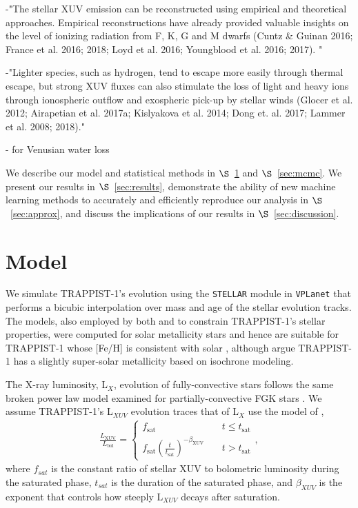 \documentclass[twocolumn]{aastex62}
\newcommand{\vplanet}[0]{\texttt{VPLanet}\xspace}
\newcommand{\stellar}[0]{\texttt{STELLAR}\xspace}
\begin{document}
-"The stellar XUV emission can be reconstructed using empirical and theoretical
approaches. Empirical reconstructions have already provided valuable insights on the level of
ionizing radiation from F, K, G and M dwarfs (Cuntz \& Guinan 2016; France et al. 2016; 2018;
Loyd et al. 2016; Youngblood et al. 2016; 2017). "

-"Lighter species, such as hydrogen, tend to escape more easily through thermal escape, but
strong XUV fluxes can also stimulate the loss of light and heavy ions through ionospheric
outflow and exospheric pick-up by stellar winds (Glocer et al. 2012; Airapetian et al. 2017a;
Kislyakova et al. 2014; Dong et. al. 2017; Lammer et al. 2008; 2018)."

-\citet{Chassefiere1997} for Venusian water loss

We describe our model and statistical methods in $\S$~\ref{sec:model} and $\S$~\ref{sec:mcmc}. We present our results in $\S$~\ref{sec:results}, demonstrate the ability of new machine learning methods to accurately and efficiently reproduce our analysis in $\S$~\ref{sec:approx}, and discuss the implications of our results in $\S$~\ref{sec:discussion}.

\section{Model} \label{sec:model}

We simulate TRAPPIST-1's evolution using the \stellar module in \vplanet \citep{Barnes2019} that performs a bicubic interpolation over mass and age of the \citet{Baraffe2015} stellar evolution tracks. The \citet{Baraffe2015} models, also employed by both \citet{Burgasser2017} and \citet{vanGrootel2018} to constrain TRAPPIST-1's stellar properties, were computed for solar metallicity stars and hence are suitable for TRAPPIST-1 whose [Fe/H] is consistent with solar \citep{Gillon2016}, although \citet{Burgasser2017} argue TRAPPIST-1 has a slightly super-solar metallicity based on isochrone modeling.

The X-ray luminosity, L$_{X}$, evolution of fully-convective stars follows the same broken power law model examined for partially-convective FGK stars \citep{Wright2016,Wright2018}. We assume TRAPPIST-1's L$_{XUV}$ evolution traces that of L$_{X}$ use the model of \citet{Ribas2005},
\begin{align}
\label{eqn:lxuv}
\frac{L_\mathrm{XUV}}{L_\mathrm{bol}} = \left\{
				\begin{array}{lcr}
					f_\mathrm{sat} &\ & t \leq t_\mathrm{sat} \\
					f_\mathrm{sat}\left(\frac{t}{t_\mathrm{sat}}\right)^{-\beta_\mathrm{XUV}} &\ & t > t_\mathrm{sat}
				\end{array}
				\right.,
\end{align}
where $f_{sat}$ is the constant ratio of stellar XUV to bolometric luminosity during the saturated phase, $t_{sat}$ is the duration of the saturated phase, and $\beta_{XUV}$ is the exponent that controls how steeply L$_{XUV}$ decays after saturation.
\end{document}
